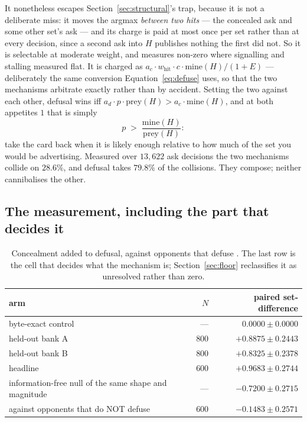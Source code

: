 \documentclass[11pt]{article}
\begin{document}
It nonetheless escapes Section~\ref{sec:structural}'s trap, because it is not a deliberate miss: it
moves the argmax \emph{between two hits} --- the concealed ask and some other set's ask --- and its
charge is paid at most once per set rather than at every decision, since a second ask into $H$
publishes nothing the first did not. So it is selectable at moderate weight, and measures non-zero
where signalling and stalling measured flat. It is charged as $a_c \cdot w_{\mathrm{hit}} \cdot c
\cdot \mathrm{mine}(H) / (1+E)$ --- deliberately the same conversion Equation~\eqref{eq:defuse}
uses, so that the two mechanisms arbitrate exactly rather than by accident. Setting the two against
each other, defusal wins iff $a_d \cdot p \cdot \mathrm{prey}(H) > a_c \cdot \mathrm{mine}(H)$, and
at both appetites $1$ that is simply
\begin{equation}
\label{eq:arbitrate}
p \;>\; \frac{\mathrm{mine}(H)}{\mathrm{prey}(H)}:
\end{equation}
take the card back when it is likely enough relative to how much of the set you would be
advertising. Measured over $13{,}622$ ask decisions the two mechanisms collide on $28.6\%$, and
defusal takes $79.8\%$ of the collisions. They compose; neither cannibalises the other.

\subsection{The measurement, including the part that decides it}
\label{sec:concealmeasure}

\begin{table}[t]
\centering
\caption{Concealment added to defusal, against opponents that defuse \cite{concession}. The
last row is the cell that decides what the mechanism is; Section~\ref{sec:floor} reclassifies it as
unresolved rather than zero.}
\label{tab:conceal}
\footnotesize
\begin{tabular}{@{}lrr@{}}
\toprule
arm & $N$ & paired set-difference \\
\midrule
byte-exact control & --- & $\mathbf{0.0000 \pm 0.0000}$ \\
held-out bank A & $800$ & $+0.8875 \pm 0.2443$ \\
held-out bank B & $800$ & $+0.8325 \pm 0.2378$ \\
headline & $600$ & $\mathbf{+0.9683 \pm 0.2744}$ \\
information-free null of the same shape and magnitude & --- & $\mathbf{-0.7200 \pm 0.2715}$ \\
against opponents that do NOT defuse & $600$ & $\mathbf{-0.1483 \pm 0.2571}$ \\
\bottomrule
\end{tabular}
\end{table}
\end{document}

